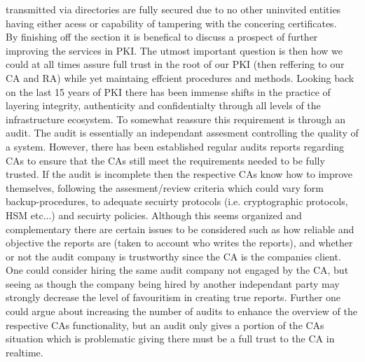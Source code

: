 \documentclass[12pt,
               a4paper,
               article,
               oneside,
               oldfontcommands,
               english]{memoir}
\begin{document}
transmitted via directories are fully secured due to no other uninvited entities having either acess or capability of tampering with the concering certificates.\vspace{4mm}\\
By finishing off the section it is benefical to discuss a prospect of further improving the services in PKI. The utmost important question is then how we could at all times assure full trust in the root of our PKI (then reffering to our CA and RA) while yet maintaing effcient procedures and methods. Looking back on the last 15 years of PKI there has been immense shifts in the practice of layering integrity, authenticity and confidentialty through all levels of the infrastructure ecosystem. To somewhat reassure this requirement is through an audit. The audit is essentially an independant assesment controlling the quality of a system. However, there has been established regular audits reports regarding CAs to ensure that the CAs still meet the requirements needed to be fully trusted. If the audit is incomplete then the respective CAs know how to improve themselves, following the assesment/review criteria which could vary form backup-procedures, to adequate secuirty protocols (i.e. cryptographic protocols, HSM etc...) and secuirty policies. Although this seems organized and complementary there are certain issues to be considered such as how reliable and objective the reports are (taken to account who writes the reports), and whether or not the audit company is trustworthy since the CA is the companies client. One could consider hiring the same audit company not engaged by the CA, but seeing as though the company being hired by another independant party may strongly decrease the level of favouritism in creating true reports. Further one could argue about increasing the number of audits to enhance the overview of the respective CAs functionality, but an audit only gives a portion of the CAs situation which is problematic giving there must be a full trust to the CA in realtime. \vspace{4mm}\\
\end{document}
